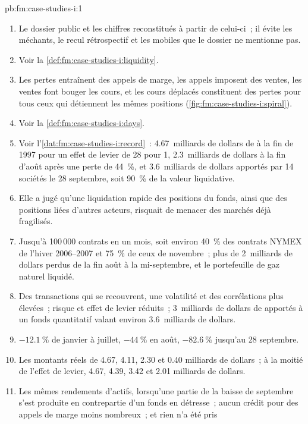 \begin{solution}{pb:fm:case-studies-i:1}
\begin{enumerate}
\item Le dossier public et les chiffres reconstitués à partir de celui-ci~; il évite les méchants, le recul rétrospectif et les mobiles que le dossier ne mentionne pas.
\item Voir la \cref{def:fm:case-studies-i:liquidity}.
\item Les pertes entraînent des appels de marge, les appels imposent des ventes, les ventes font bouger les cours, et les cours déplacés constituent des pertes pour tous ceux qui détiennent les mêmes positions
(\cref{fig:fm:case-studies-i:spiral}).
\item Voir la \cref{def:fm:case-studies-i:days}.
\item Voir l'\cref{dat:fm:case-studies-i:record}~: 4.67~milliards de dollars de  à la fin de 1997 pour un effet de levier de 28 pour 1, 2.3~milliards de dollars à la fin d'août après une
perte de 44~\%, et 3.6~milliards de dollars apportés par 14 sociétés le 28 septembre, soit 90~\% de la valeur liquidative.
\item Elle a jugé qu'une liquidation rapide des positions du fonds, ainsi que des positions liées d'autres acteurs, risquait de menacer des marchés déjà fragilisés.
\item Jusqu'à 100\,000 contrats en un mois, soit environ 40~\% des contrats NYMEX de l'hiver 2006--2007 et 75~\% de ceux de novembre~; plus de 2~milliards de dollars perdus
de la fin août à la mi-septembre, et le portefeuille de gaz naturel liquidé.
\item Des transactions qui se recouvrent, une volatilité et des corrélations plus élevées~; risque et effet de levier réduits~; 3~milliards de dollars de  apportés à un fonds quantitatif valant environ
3.6~milliards de dollars.
\item $-12.1~\%$ de janvier à juillet, $-44~\%$ en août, $-82.6~\%$ jusqu'au 28 septembre.
\item Les montants réels de 4.67, 4.11, 2.30 et 0.40 milliards de dollars~; à la moitié de l'effet de levier, 4.67, 4.39, 3.42 et 2.01 milliards de dollars.
\item Les mêmes rendements d'actifs, lorsqu'une partie de la baisse de septembre s'est produite en contrepartie d'un fonds en détresse~; aucun crédit pour des appels de marge moins nombreux~; et rien n'a été pris

\end{enumerate}
\end{solution}
